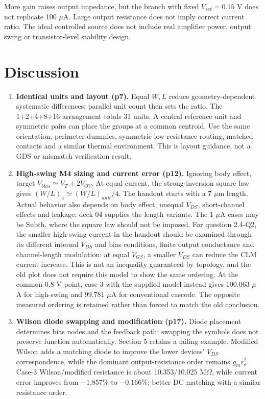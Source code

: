 More gain raises output impedance, but the branch with fixed $V_{set}=0.15$ V does not replicate 100 $\mu$A. Large output resistance does not imply correct current ratio. The ideal controlled source does not include real amplifier power, output swing or transistor-level stability design.

\section{Discussion}
\begin{enumerate}
\item \textbf{Identical units and layout (p7).} Equal $W,L$ reduce geometry-dependent systematic differences; parallel unit count then sets the ratio. The 1+2+4+8+16 arrangement totals 31 units. A central reference unit and symmetric pairs can place the groups at a common centroid. Use the same orientation, perimeter dummies, symmetric low-resistance routing, matched contacts and a similar thermal environment. This is layout guidance, not a GDS or mismatch verification result.
\item \textbf{High-swing M4 sizing and current error (p12).} Ignoring body effect, target $V_{bias}\simeq V_T+2V_{OV}$. At equal current, the strong-inversion square law gives $(W/L)_4\simeq(W/L)_{unit}/4$. The handout starts with a 7 $\mu$m length. Actual behavior also depends on body effect, unequal $V_{DS}$, short-channel effects and leakage; deck 04 supplies the length variants. The 1 $\mu$A cases may be Subth, where the square law should not be imposed. For question 2.4-Q2, the smaller high-swing current in the handout should be examined through its different internal $V_{DS}$ and bias conditions, finite output conductance and channel-length modulation: at equal $V_{GS}$, a smaller $V_{DS}$ can reduce the CLM current increase. This is not an inequality guaranteed by topology, and the old plot does not require this model to show the same ordering. At the common 0.8 V point, case 3 with the supplied model instead gives 100.063 $\mu$A for high-swing and 99.781 $\mu$A for conventional cascode. The opposite measured ordering is retained rather than forced to match the old conclusion.
\item \textbf{Wilson diode swapping and modification (p17).} Diode placement determines bias nodes and the feedback path; swapping the symbols does not preserve function automatically. Section 5 retains a failing example. Modified Wilson adds a matching diode to improve the lower devices' $V_{DS}$ correspondence, while the dominant output-resistance order remains $g_mr_o^2$. Case-3 Wilson/modified resistance is about 10.353/10.025 M$\Omega$, while current error improves from $-1.857\%$ to $-0.166\%$: better DC matching with a similar resistance order.

\end{enumerate}
